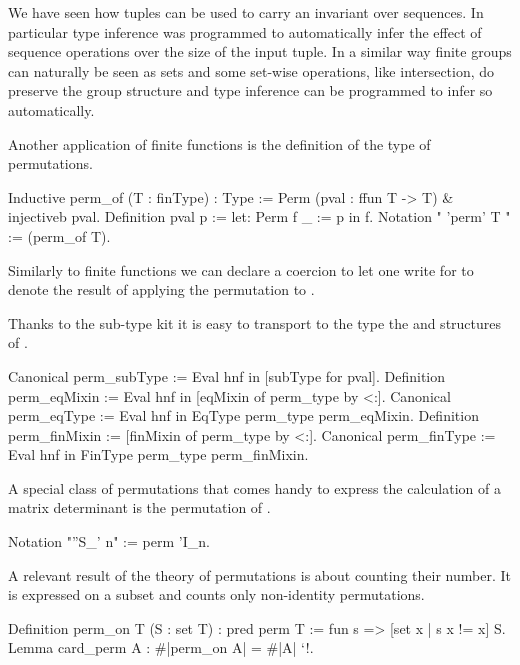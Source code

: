 We have seen how tuples can be used to carry an invariant over
sequences. In particular type inference was programmed to
automatically infer the effect of sequence operations over the
size of the input tuple.  In a similar way finite groups can naturally
be seen as sets and some set-wise operations, like intersection,
do preserve the group structure and type inference can be programmed
to infer so automatically.

\mcbLEARN{}
\mcbPROVIDE{}
\mcbREQUIRE{}

Another application of finite functions is the definition of
the type of permutations.

\begin{coq}{}{}
Inductive perm_of (T : finType) : Type :=
  Perm (pval : {ffun T -> T}) & injectiveb pval.
Definition pval p := let: Perm f _ := p in f.
Notation "{ 'perm' T }" := (perm_of T).
\end{coq}

Similarly to finite functions we can declare a coercion to let
one write  for  to denote
the result of applying the permutation  to .

Thanks to the sub-type kit it is easy to transport to the type
 the  and  structures of .

\begin{coq}{}{}
Canonical perm_subType := Eval hnf in [subType for pval].
Definition perm_eqMixin := Eval hnf in [eqMixin of perm_type by <:].
Canonical perm_eqType := Eval hnf in EqType perm_type perm_eqMixin.
Definition perm_finMixin := [finMixin of perm_type by <:].
Canonical perm_finType := Eval hnf in FinType perm_type perm_finMixin.
\end{coq}

A special class of permutations that comes handy to express the
calculation of a matrix determinant is the permutation of
.

\begin{coq}{}{}
Notation "''S_' n" := {perm 'I_n}.
\end{coq}

A relevant result of the theory of permutations is about
counting their number.  It is expressed on a subset  and
counts only non-identity permutations.

\begin{coq}{}{}
Definition perm_on T (S : {set T}) : pred {perm T} :=
  fun s => [set x | s x != x] \subset S.
Lemma card_perm A : #|perm_on A| = #|A| `!.
\end{coq}

